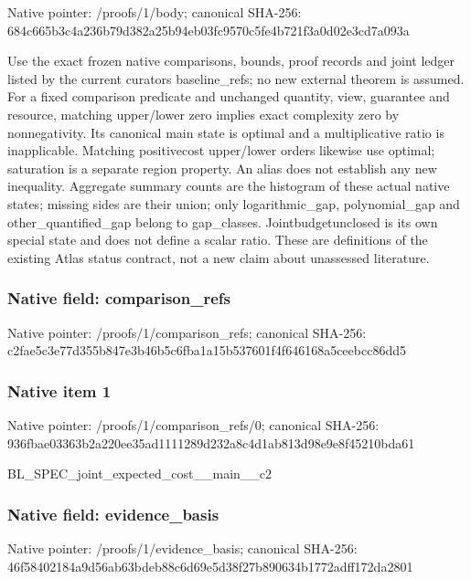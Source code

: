 \documentclass[10pt,a4paper]{article}
\begin{document}
Native pointer: /proofs/1/body; canonical SHA-256: 684c665b3c4a236b79d382a2\allowbreak{}5b94eb03fc9570c5fe4b721f\allowbreak{}3a0d02e3cd7a093a


Use the exact frozen native comparisons, bounds, proof records and joint ledger listed by the current curators baseline\_refs; no new external theorem is assumed. For a fixed comparison predicate and unchanged quantity, view, guarantee and resource, matching upper/lower zero implies exact complexity zero by nonnegativity. Its canonical main state is optimal and a multiplicative ratio is inapplicable. Matching positivecost upper/lower orders likewise use optimal; saturation is a separate region property. An alias does not establish any new inequality. Aggregate summary counts are the histogram of these actual native states; missing sides are their union; only logarithmic\_gap, polynomial\_gap and other\_quantified\_gap belong to gap\_classes. Jointbudgetunclosed is its own special state and does not define a scalar ratio. These are definitions of the existing Atlas status contract, not a new claim about unassessed literature.


\subsubsection{Native field: comparison\_refs}


Native pointer: /proofs/1/comparison\_refs; canonical SHA-256: c2fae5c3e77d355b847e3b46\allowbreak{}b5c6fba1a15b537601f4f646\allowbreak{}168a5ceebcc86dd5



\subsubsection{Native item 1}


Native pointer: /proofs/1/comparison\_refs/0; canonical SHA-256: 936fbae03363b2a220ee35ad\allowbreak{}1111289d232a8c4d1ab813d9\allowbreak{}8e9e8f45210bda61


BL\_SPEC\_joint\_expected\_cost\_\_main\_\_c2


\subsubsection{Native field: evidence\_basis}


Native pointer: /proofs/1/evidence\_basis; canonical SHA-256: 46f58402184a9d56ab63bdeb\allowbreak{}88c6d69e5d38f27b890634b1\allowbreak{}772adff172da2801
\end{document}
